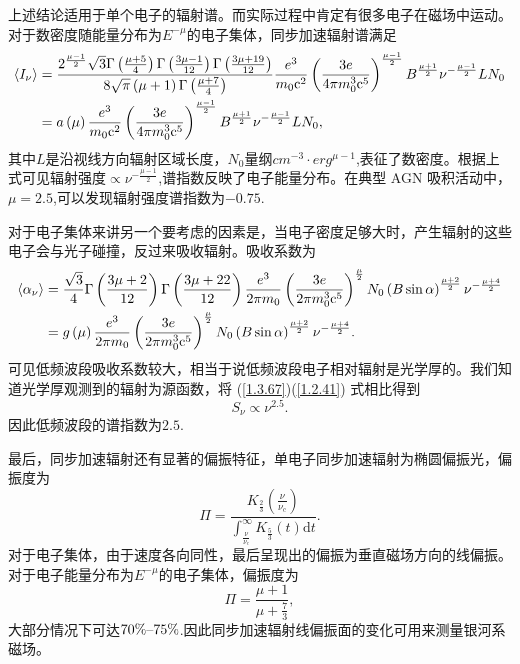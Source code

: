 \documentclass[../天体物理基础.tex]{subfiles}
\begin{document}
上述结论适用于单个电子的辐射谱。而实际过程中肯定有很多电子在磁场中运动。对于数密度随能量分布为$E^{-\mu}$的电子集体，同步加速辐射谱满足
\begin{align}
\langle I_{\nu}\rangle&=\frac{2^{\frac{\mu-1}{2}}\sqrt3\Gamma\left(\frac{\mu+5}{4}\right)\Gamma\left(\frac{3\mu-1}{12}\right)\Gamma\left(\frac{3\mu+19}{12}\right)}{8\sqrt\pi\left(\mu+1\right)\Gamma\left(\frac{\mu+7}{4}\right)}\frac{e^{3}}{m_{0}\mathrm{c}^{2}}\left(\frac{3e}{4\pi m_{0}^{3}\mathrm{c}^{5}}\right)^{\frac{\mu-1}2}B^{\frac{\mu+1}{2}}\nu^{-\frac{\mu-1}{2}}LN_{0}\notag\\
&=a\left(\mu\right)\frac{e^{3}}{m_{0}\mathrm{c}^{2}}\left(\frac{3e}{4\pi m_{0}^{3}\mathrm{c}^{5}}\right)^{\frac{\mu-1}2}B^{\frac{\mu+1}{2}}\nu^{-\frac{\mu-1}{2}}LN_{0},\label{1.3.67}
\end{align}
其中$L$是沿视线方向辐射区域长度，$N_{0}$量纲$\unit{cm^{-3}\cdot erg^{\mu-1}}$,表征了数密度。根据上式可见辐射强度$\propto{}\nu^{-\frac{\mu-1}{2}}$,谱指数反映了电子能量分布。在典型 AGN 吸积活动中，$\mu=2.5$,可以发现辐射强度谱指数为$-0.75$.

对于电子集体来讲另一个要考虑的因素是，当电子密度足够大时，产生辐射的这些电子会与光子碰撞，反过来吸收辐射。吸收系数为
\begin{align}
\langle{}\alpha_{\nu}\rangle&=\frac{\sqrt{3}}{4}\Gamma\left(\frac{3\mu+2}{12}\right)\Gamma\left(\frac{3\mu+22}{12}\right)\frac{e^{3}}{2\pi m_{0}}\left(\frac{3e}{2\pi m_{0}^{3}\mathrm{c}^{5}}\right)^{\frac{\mu}{2}}N_{0}\left(B\sin\alpha\right)^{\frac{\mu+2}{2}}\nu^{-\frac{\mu+4}{2}}\notag\\
&=g\left(\mu\right)\frac{e^{3}}{2\pi m_{0}}\left(\frac{3e}{2\pi m_{0}^{3}\mathrm{c}^{5}}\right)^{\frac{\mu}{2}}N_{0}\left(B\sin\alpha\right)^{\frac{\mu+2}{2}}\nu^{-\frac{\mu+4}{2}}.\label{1.2.41}
\end{align}
可见低频波段吸收系数较大，相当于说低频波段电子相对辐射是光学厚的。我们知道光学厚观测到的辐射为源函数，将 (\ref{1.3.67})(\ref{1.2.41}) 式相比得到
\begin{equation}
S_{\nu}\propto{}\nu^{2.5}.
\end{equation}
因此低频波段的谱指数为$2.5$.

最后，同步加速辐射还有显著的偏振特征，单电子同步加速辐射为椭圆偏振光，偏振度为
\begin{equation}
\Pi=\frac{K_{\frac{2}{3}}\left(\frac{\nu}{\nu_\mathrm{c}}\right)}{\int_{\frac{\nu}{\nu_\mathrm{c}}}^{\infty}K_{\frac{5}{3}}\left(t\right)\mathrm{d}t}.
\end{equation}
对于电子集体，由于速度各向同性，最后呈现出的偏振为垂直磁场方向的线偏振。对于电子能量分布为$E^{-\mu}$的电子集体，偏振度为
\begin{equation}
\Pi=\frac{\mu+1}{\mu+\frac{7}{3}},
\end{equation}
大部分情况下可达$70\%\text{\textendash}75\%$.因此同步加速辐射线偏振面的变化可用来测量银河系磁场。
\end{document}
